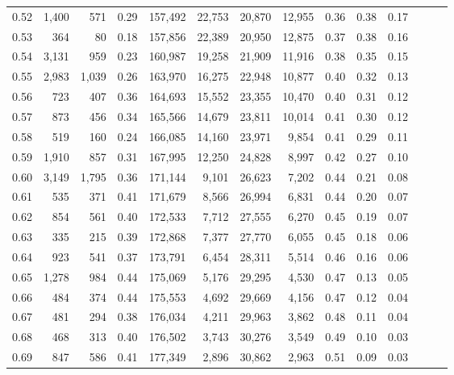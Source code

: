 \begin{tabular}{rrrrrrrrrrrrrr}
0.52 &   1,400 &    571 &  0.29 &  157,492 &   22,753 &  20,870 &  12,955 &  0.36 &  0.38 &      0.17 \\
0.53 &     364 &     80 &  0.18 &  157,856 &   22,389 &  20,950 &  12,875 &  0.37 &  0.38 &      0.16 \\
0.54 &   3,131 &    959 &  0.23 &  160,987 &   19,258 &  21,909 &  11,916 &  0.38 &  0.35 &      0.15 \\
0.55 &   2,983 &  1,039 &  0.26 &  163,970 &   16,275 &  22,948 &  10,877 &  0.40 &  0.32 &      0.13 \\
0.56 &     723 &    407 &  0.36 &  164,693 &   15,552 &  23,355 &  10,470 &  0.40 &  0.31 &      0.12 \\
0.57 &     873 &    456 &  0.34 &  165,566 &   14,679 &  23,811 &  10,014 &  0.41 &  0.30 &      0.12 \\
0.58 &     519 &    160 &  0.24 &  166,085 &   14,160 &  23,971 &   9,854 &  0.41 &  0.29 &      0.11 \\
0.59 &   1,910 &    857 &  0.31 &  167,995 &   12,250 &  24,828 &   8,997 &  0.42 &  0.27 &      0.10 \\
0.60 &   3,149 &  1,795 &  0.36 &  171,144 &    9,101 &  26,623 &   7,202 &  0.44 &  0.21 &      0.08 \\
0.61 &     535 &    371 &  0.41 &  171,679 &    8,566 &  26,994 &   6,831 &  0.44 &  0.20 &      0.07 \\
0.62 &     854 &    561 &  0.40 &  172,533 &    7,712 &  27,555 &   6,270 &  0.45 &  0.19 &      0.07 \\
0.63 &     335 &    215 &  0.39 &  172,868 &    7,377 &  27,770 &   6,055 &  0.45 &  0.18 &      0.06 \\
0.64 &     923 &    541 &  0.37 &  173,791 &    6,454 &  28,311 &   5,514 &  0.46 &  0.16 &      0.06 \\
0.65 &   1,278 &    984 &  0.44 &  175,069 &    5,176 &  29,295 &   4,530 &  0.47 &  0.13 &      0.05 \\
0.66 &     484 &    374 &  0.44 &  175,553 &    4,692 &  29,669 &   4,156 &  0.47 &  0.12 &      0.04 \\
0.67 &     481 &    294 &  0.38 &  176,034 &    4,211 &  29,963 &   3,862 &  0.48 &  0.11 &      0.04 \\
0.68 &     468 &    313 &  0.40 &  176,502 &    3,743 &  30,276 &   3,549 &  0.49 &  0.10 &      0.03 \\
0.69 &     847 &    586 &  0.41 &  177,349 &    2,896 &  30,862 &   2,963 &  0.51 &  0.09 &      0.03 \\

\end{tabular}
